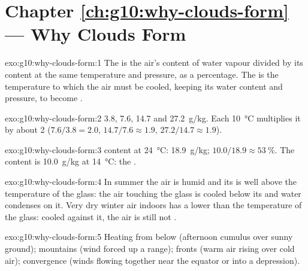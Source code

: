 \section*{Chapter \ref{ch:g10:why-clouds-form} --- Why Clouds Form}

\begin{solution}{exo:g10:why-clouds-form:1}
The  is the air's content of water vapour divided by its
 content at the same temperature and pressure, as a percentage.
The  is the temperature to which the air must be cooled, keeping
its water content and pressure, to become .
\end{solution}

\begin{solution}{exo:g10:why-clouds-form:2}
\num{3.8}, \num{7.6}, \num{14.7} and \qty{27.2}{g/kg}. Each
\qty{10}{\degreeCelsius} multiplies it by about 2 ($7.6/3.8 = 2.0$,
$14.7/7.6 \approx 1.9$, $27.2/14.7 \approx 1.9$).
\end{solution}

\begin{solution}{exo:g10:why-clouds-form:3}
 content at \qty{24}{\degreeCelsius}: \qty{18.9}{g/kg};  $10.0/18.9 \approx \qty{53}{\percent}$. The  content is
\qty{10.0}{g/kg} at \qty{14}{\degreeCelsius}: the .
\end{solution}

\begin{solution}{exo:g10:why-clouds-form:4}
In summer the air is humid and its  is well above the temperature
of the glass: the air touching the glass is cooled below its  and
water condenses on it. Very dry winter air indoors has a  lower
than the temperature of the glass: cooled against it, the air is still not
.
\end{solution}

\begin{solution}{exo:g10:why-clouds-form:5}
Heating from below (afternoon cumulus over sunny ground); mountains (wind
forced up a range); fronts (warm air rising over cold air); convergence
(winds flowing together near the equator or into a depression).
\end{solution}

